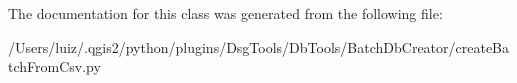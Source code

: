 The documentation for this class was generated from the following file\+:\begin{DoxyCompactItemize}
\item 
/\+Users/luiz/.\+qgis2/python/plugins/\+Dsg\+Tools/\+Db\+Tools/\+Batch\+Db\+Creator/create\+Batch\+From\+Csv.\+py\end{DoxyCompactItemize}
